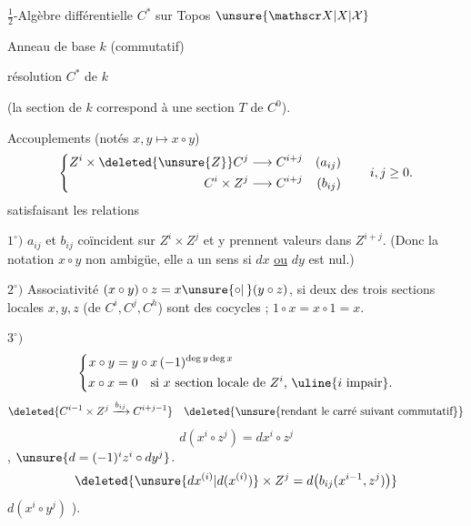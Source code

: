 \(\tfrac12\)-Algèbre différentielle \(C^*\) sur Topos \(\unsure{\mathscr X|X|\mathcal X}\)

Anneau de base \(k\) (commutatif)

résolution \(C^*\) de \(k\)

(la section  de \(k\) correspond à une section \(T\) de \(C^0\)).

Accouplements  (notés \(x,y\longmapsto x\circ y\))
\[
 \left\{\begin{aligned}
 Z^i\times\deleted{\unsure{Z}}C^j&\longrightarrow C^{i+j} &(a_{ij})\\
 C^i\times Z^j&\longrightarrow C^{i+j} &(b_{ij})
 \end{aligned}\right.\qquad i,j\geq0.
\]
satisfaisant les relations

\(1^\circ)\) \(a_{ij}\) et \(b_{ij}\) coïncident sur \(Z^i\times Z^j\) et y prennent valeurs dans \(Z^{i+j}\). (Donc la notation  \(x\circ y\) non ambigüe, elle a un sens si \(dx\) \uline{ou} \(dy\) est nul.)

\(2^\circ)\) Associativité \((x\circ y)\circ z=x\unsure{\circ|\,}(y\circ z)\), si deux des trois sections locales \(x,y,z\) (de \(C^i,C^j,C^h\)) sont des cocycles ; \(1\circ x=x\circ1=x\).

\(3^\circ)\)
\[
 \left\{\begin{aligned}
 x\circ y&=y\circ x\,(-1)^{\deg y\deg x}\\
 x\circ x&=0\quad\text{si \(x\) section locale de \(Z^i\), \uline{\(i\) impair}.}
 \end{aligned}\right.
\]
\[
 \deleted{C^{i-1}\times Z^j\xrightarrow{b_{ij}} C^{i+j-1}}
 \quad \deleted{\text{\unsure{rendant le carré suivant commutatif}}}
\]
\[
 \boxed{d(x^i\circ z^j)=dx^i\circ z^j}
\]
,  \(\unsure{d=(-1)^i z^i\circ dy^j}\).
\[
 \deleted{\unsure{d x^{(i)}|d(x^{(i)})}\times Z^j=d\bigl(b_{ij}(x^{i-1},z^j)\bigr)}
\]
 \(d(x^i\circ y^j)\) ).

